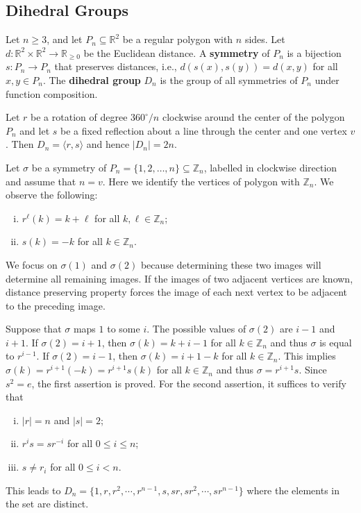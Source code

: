\subsection{Dihedral Groups} 
\begin{definition}
	Let $n \geq 3$, and let $P_n \subseteq \mathbb{R}^2$ be a regular polygon with $n$ sides. Let $d:\mathbb{R}^2 \times \mathbb{R}^2 \to \mathbb{R}_{\geq 0}$ be the Euclidean distance. A \textbf{symmetry} of $P_n$ is a bijection $s:P_n \to P_n$ that preserves distances, i.e., $d(s(x),s(y))=d(x,y)$ for all $x,y\in P_n$. The \textbf{dihedral group} $D_n$ is the group of all symmetries of $P_n$ under function composition.
\end{definition}
\begin{proposition}
	Let $r$ be a rotation of degree $360^\circ/n$ clockwise around the center of the polygon $P_n$ and let $s$ be a fixed reflection about a line through the center and one vertex $v$. Then $D_{n} = \langle r,s\rangle$ and hence $|D_{n}|  = 2n$.
\end{proposition}
\begin{sketch}
	Let $\sigma$ be a symmetry of $P_n = \{1,2,\dots, n\}\subseteq \mathbb{Z}_n$, labelled in clockwise direction and assume that $n = v$. Here we identify the vertices of polygon with $\mathbb{Z}_n$. We observe the following:
	\begin{enumerate}[(i)]
		\item $r^{\ell}(k) = k+\ell$ for all $k,\ell\in \mathbb{Z}_n$;
		\item $s(k) = -k$ for all $k\in \mathbb{Z}_n$. 
	\end{enumerate} 
	We focus on $\sigma(1)$ and $\sigma(2)$ because determining these two images will determine all remaining images. If the images of two adjacent vertices are known, distance preserving property forces the image of each next vertex to be adjacent to the preceding image.
	
	Suppose that $\sigma$ maps $1$ to some $i$. The possible values of $\sigma(2)$ are $i-1$ and $i+1$. If $\sigma(2) = i+1$, then $\sigma(k) = k+i-1$ for all $k\in\mathbb{Z}_n$ and thus $\sigma$ is equal to  $r^{i-1}$.   If $\sigma(2) = i-1$, then $\sigma(k) = i+1-k$  for all $k\in\mathbb{Z}_n$. This implies $\sigma(k) = r^{i+1}(-k) = r^{i+1}s(k)$ for all $k\in \mathbb{Z}_n$ and thus $\sigma = r^{i+1}s$. Since $s^2=e$, the first assertion is proved. For the second assertion, it suffices to verify that
	\begin{enumerate}[(i)]
		\item $|r| = n$ and $|s| = 2$;
		\item $r^is = sr^{-i}$ for all $0 \leq i \leq n$;
		\item $s\neq r_i$ for all $0\leq i<n$.
	\end{enumerate}
	This leads to $D_{n}= \{1,r,r^2,\cdots, r^{n-1},s,sr,sr^2,\cdots, sr^{n-1}\}$ where the elements in the set are distinct.
\end{sketch}
